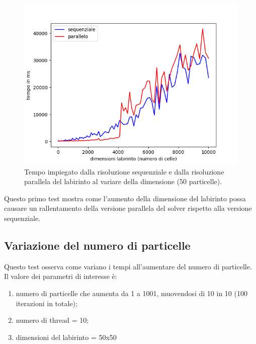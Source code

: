 \documentclass[10pt,twocolumn,letterpaper]{article}
\begin{document}
\begin{figure}[H]
\includegraphics[width=1.1\linewidth]{test/test1}
\caption{\small Tempo impiegato dalla risoluzione sequenziale e dalla risoluzione parallela del labirinto al variare della dimensione (50 particelle).}
\label{t1}
\end{figure}

Questo primo test mostra come l'aumento della dimensione del labirinto possa causare un rallentamento della versione parallela del solver rispetto alla versione sequenziale.

\subsection{Variazione del numero di particelle}

Questo test osserva come variano i tempi all'aumentare del numero di particelle.\\
Il valore dei parametri di interesse è:
\begin{enumerate}[-]
\item{numero di particelle che aumenta da 1 a 1001, muovendosi di 10 in 10 (100 iterazioni in totale);}
\item{numero di thread = 10;}
\item{dimensioni del labirinto = 50x50}
\end{enumerate}
\end{document}
